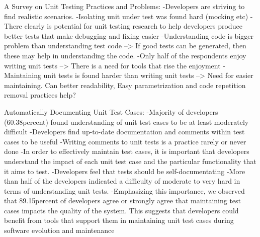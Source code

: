     A Survey on Unit Testing Practices and Problems:\newline
    -Developers are striving to find realistic scenarios.\newline
    -Isolating unit under test was found hard (mocking etc)\newline
    -There clearly is potential for unit testing research to help developers produce better tests that make debugging and fixing easier\newline
    -Understanding code is bigger problem than understanding test code\newline
    --> If good tests can be generated, then these may help in understanding the code.\newline
    -Only half of the respondents enjoy writing unit tests\newline
    --> There is a need for tools that rise the enjoyment\newline
    -Maintaining unit tests is found harder than writing unit tests\newline
    --> Need for easier maintaining. Can better readability, Easy parametrization and code repetition removal practices help?\newline\newline

    Automatically Documenting Unit Test Cases:\newline
    -Majority of developers (60.38percent) found understanding of unit test cases to be at least moderately difficult\newline
    -Developers find up-to-date documentation and comments within test cases to be useful\newline
    -Writing comments to unit tests is a practice rarely or never done\newline
    -In order to effectively maintain test cases, it is important that developers understand the impact of each unit
     test case and the particular functionality that it aims to test.\newline
    -Developers feel that tests should be self-documentating\newline
    -More than half of the developers indicated a difficulty of moderate to very hard in terms of understanding unit tests.\newline
    -Emphasizing this importance, we observed that 89.15percent of developers agree or strongly agree that maintaining test cases
      impacts the quality of the system. This suggests that developers could benefit from tools that support them in maintaining unit test
       cases during software evolution and maintenance\newline\newline


